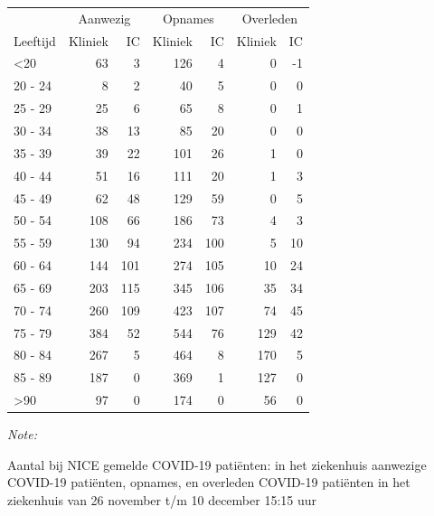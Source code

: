 \documentclass[
  english,
  man,floatsintext]{apa6}
\begin{document}
\begin{table}
\centering\begingroup\fontsize{10}{12}\selectfont

\begin{threeparttable}
\begin{tabular}{lrrrrrr}
\toprule
\multicolumn{1}{c}{ } & \multicolumn{2}{c}{Aanwezig} & \multicolumn{2}{c}{Opnames} & \multicolumn{2}{c}{Overleden} \\
\cmidrule(l{3pt}r{3pt}){2-3} \cmidrule(l{3pt}r{3pt}){4-5} \cmidrule(l{3pt}r{3pt}){6-7}
Leeftijd & Kliniek & IC & Kliniek & IC & Kliniek & IC\\
\midrule
<20 & 63 & 3 & 126 & 4 & 0 & -1\\
20 - 24 & 8 & 2 & 40 & 5 & 0 & 0\\
25 - 29 & 25 & 6 & 65 & 8 & 0 & 1\\
30 - 34 & 38 & 13 & 85 & 20 & 0 & 0\\
35 - 39 & 39 & 22 & 101 & 26 & 1 & 0\\
40 - 44 & 51 & 16 & 111 & 20 & 1 & 3\\
45 - 49 & 62 & 48 & 129 & 59 & 0 & 5\\
50 - 54 & 108 & 66 & 186 & 73 & 4 & 3\\
55 - 59 & 130 & 94 & 234 & 100 & 5 & 10\\
60 - 64 & 144 & 101 & 274 & 105 & 10 & 24\\
65 - 69 & 203 & 115 & 345 & 106 & 35 & 34\\
70 - 74 & 260 & 109 & 423 & 107 & 74 & 45\\
75 - 79 & 384 & 52 & 544 & 76 & 129 & 42\\
80 - 84 & 267 & 5 & 464 & 8 & 170 & 5\\
85 - 89 & 187 & 0 & 369 & 1 & 127 & 0\\
>90 & 97 & 0 & 174 & 0 & 56 & 0\\
\bottomrule
\end{tabular}
\begin{tablenotes}
\item \textit{Note: } 
\item Aantal bij NICE gemelde COVID-19 patiënten: in het ziekenhuis aanwezige COVID-19 patiënten, opnames, en overleden COVID-19 patiënten in het ziekenhuis van 26 november t/m 10 december 15:15 uur
\end{tablenotes}
\end{threeparttable}
\endgroup{}
\end{table}

\newpage
\end{document}
